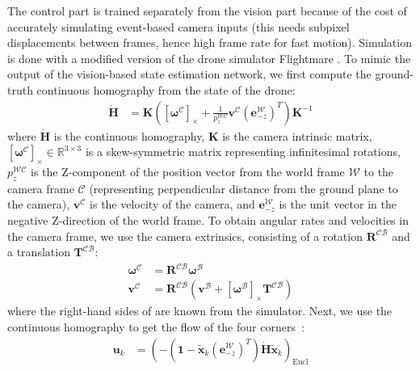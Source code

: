 The control part is trained separately from the vision part because of the cost of accurately simulating event-based camera inputs (this needs subpixel displacements between frames, hence high frame rate for fast motion). Simulation is done with a modified version of the drone simulator Flightmare \cite{song2021flightmare}. To mimic the output of the vision-based state estimation network, we first compute the ground-truth continuous homography \cite{ma2004invitation,zhong2020direct} from the state of the drone:
\begin{align}
    \boldsymbol{\dot{H}} &= \boldsymbol{K} \left( [\boldsymbol{\omega}^\mathcal{C}]_\times + \frac{1}{p^\mathcal{WC}_z}\boldsymbol{v}^\mathcal{C}(\boldsymbol{e}^\mathcal{W}_{-z})^T \right) \boldsymbol{K}^{-1}
\end{align}
where $\boldsymbol{\dot{H}}$ is the continuous homography, $\boldsymbol{K}$ is the camera intrinsic matrix, $[\boldsymbol{\omega}^\mathcal{C}]_\times \in \mathbb{R}^{3\times 3}$ is a skew-symmetric matrix representing infinitesimal rotations, $p_z^\mathcal{WC}$ is the Z-component of the position vector from the world frame $\mathcal{W}$ to the camera frame $\mathcal{C}$ (representing perpendicular distance from the ground plane to the camera), $\boldsymbol{v}^\mathcal{C}$ is the velocity of the camera, and $\boldsymbol{e}_{-z}^\mathcal{W}$ is the unit vector in the negative Z-direction of the world frame. To obtain angular rates and velocities in the camera frame, we use the camera extrinsics, consisting of a rotation $\boldsymbol{R}^\mathcal{CB}$ and a translation $\boldsymbol{T}^\mathcal{CB}$:
\begin{align}
    \boldsymbol{\omega}^\mathcal{C} &= \boldsymbol{R}^\mathcal{CB} \boldsymbol{\omega}^\mathcal{B}\label{eq:wc} \\
    \boldsymbol{v}^\mathcal{C} &= \boldsymbol{R}^\mathcal{CB} \left( \boldsymbol{v}^\mathcal{B} + [\boldsymbol{\omega}^\mathcal{B}]_\times \boldsymbol{T}^\mathcal{CB} \right)\label{eq:vc}
\end{align}
where the right-hand sides of  are known from the simulator. Next, we use the continuous homography to get the flow of the four corners~\cite{ma2004invitation,zhong2020direct}:
\begin{align}
    \boldsymbol{u}_k &= \left(-\left(\boldsymbol{1} - \tilde{\boldsymbol{x}}_k(\boldsymbol{e}^\mathcal{W}_{-z})^T\right)\boldsymbol{\dot{H}}\tilde{\boldsymbol{x}}_k\right)_\mathrm{Eucl}
\end{align}
